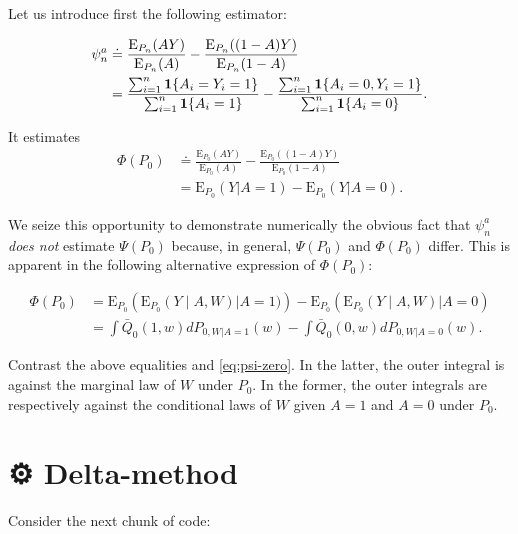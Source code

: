 \documentclass[11pt,openright,twoside]{book}
\newcommand{\gear}{\usebox{\gearbox}\;}
\newcommand{\defq}{\doteq}
\newcommand{\Exp}{\textrm{E}}
\newcommand{\one}{\textbf{1}}
\newcommand{\Qbar}{\bar{Q}}
\theoremstyle{definition}
\theoremstyle{definition}
\theoremstyle{definition}
\theoremstyle{remark}
\begin{document}
Let us introduce first the following estimator:

\begin{align}
\notag \psi_{n}^{a}
&\defq \frac{\Exp_{P_{n}} (AY)}{\Exp_{P_{n}} (A)} - \frac{\Exp_{P_{n}}
((1-A)Y)}{\Exp_{P_{n}}(1-A)} \\ 
&=          \frac{\sum_{i=1}^{n}         \one\{A_{i}=Y_{i}=1\}}{\sum_{i=1}^{n}
\one\{A_{i}=1\}}                     -                    \frac{\sum_{i=1}^{n}
\one\{A_{i}=0,Y_{i}=1\}}{\sum_{i=1}^{n}\one\{A_{i}=0\}}. \label{eq:cautionary} 
\end{align}

It estimates \begin{align*}\Phi(P_{0})    &\defq    \frac{\Exp_{P_{0}}
(AY)}{\Exp_{P_{0}} (A)} - \frac{\Exp_{P_{0}} ((1-A)Y)}{\Exp_{P_{0}} (1-A)}\\&=
\Exp_{P_{0}} (Y | A=1) - \Exp_{P_{0}} (Y | A=0).\end{align*}

We seize this opportunity to demonstrate numerically the obvious fact that
\(\psi_{n}^{a}\) \emph{does not} estimate \(\Psi(P_{0})\) because, in general,
\(\Psi(P_{0})\) and \(\Phi(P_{0})\) differ. This is apparent in the following
alternative expression of \(\Phi(P_{0})\):

\begin{align*} \Phi(P_{0}) &= \Exp_{P_{0}} \left(\Exp_{P_0}(Y \mid A, W) |A=1)
\right) -  \Exp_{P_{0}} \left(\Exp_{P_0}(Y \mid  A, W) | A=0\right)\\  &= \int
\Qbar_{0}(1, w) dP_{0,W|A=1}(w) - \int \Qbar_{0}(0, w) dP_{0,W|A=0}(w).
\end{align*}

Contrast the above equalities and \eqref{eq:psi-zero}. In the latter, the
outer integral is against the marginal law of \(W\) under \(P_{0}\). In the
former, the outer integrals are respectively against the conditional laws of
\(W\) given \(A=1\) and \(A=0\) under \(P_{0}\).

\hypertarget{delta-method}{%
\section{\texorpdfstring{⚙ \gear Delta-method}{⚙ Delta-method}}\label{delta-method}}

Consider the next chunk of code:
\end{document}
